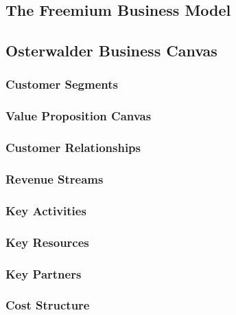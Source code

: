 \lipsum[1-2]

\subsection{The Freemium Business Model}
\lipsum[1-2]

\subsection{Osterwalder Business Canvas}
\lipsum[1]

\subsubsection{Customer Segments}
\lipsum[1]

\subsubsection{Value Proposition Canvas}
\lipsum[1-4]

\subsubsection{Customer Relationships}
\lipsum[1]


\subsubsection{Revenue Streams}
\lipsum[1]

\subsubsection{Key Activities}
\lipsum[1]

\subsubsection{Key Resources}
\lipsum[1]

\subsubsection{Key Partners}
\lipsum[1]

\subsubsection{Cost Structure}
\lipsum[1]